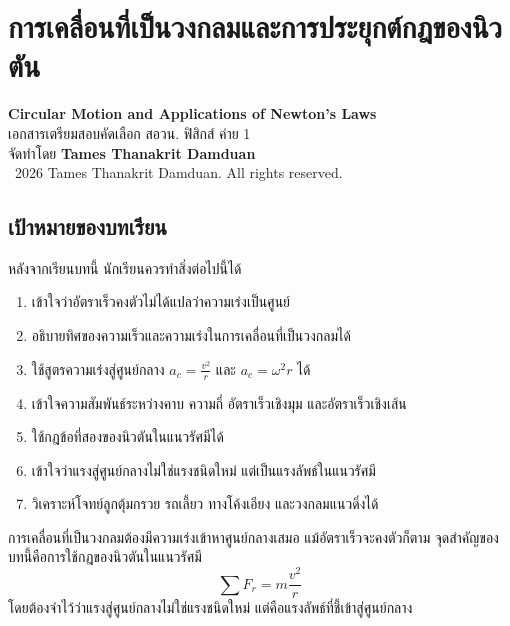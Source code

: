 
\chapter{การเคลื่อนที่เป็นวงกลมและการประยุกต์กฎของนิวตัน}

\begin{center}
    {\Large \textbf{Circular Motion and Applications of Newton's Laws}}\\[4pt]
    {\normalsize เอกสารเตรียมสอบคัดเลือก สอวน. ฟิสิกส์ ค่าย 1}\\[6pt]
    {\normalsize จัดทำโดย \textbf{Tames Thanakrit Damduan}}\\[2pt]
    {\footnotesize \textcopyright\ 2026 Tames Thanakrit Damduan. All rights reserved.}\\[8pt]
\end{center}

\section*{เป้าหมายของบทเรียน}

หลังจากเรียนบทนี้ นักเรียนควรทำสิ่งต่อไปนี้ได้

\begin{enumerate}
    \item เข้าใจว่าอัตราเร็วคงตัวไม่ได้แปลว่าความเร่งเป็นศูนย์
    \item อธิบายทิศของความเร็วและความเร่งในการเคลื่อนที่เป็นวงกลมได้
    \item ใช้สูตรความเร่งสู่ศูนย์กลาง $a_c=\frac{v^2}{r}$ และ $a_c=\omega^2r$ ได้
    \item เข้าใจความสัมพันธ์ระหว่างคาบ ความถี่ อัตราเร็วเชิงมุม และอัตราเร็วเชิงเส้น
    \item ใช้กฎข้อที่สองของนิวตันในแนวรัศมีได้
    \item เข้าใจว่าแรงสู่ศูนย์กลางไม่ใช่แรงชนิดใหม่ แต่เป็นแรงลัพธ์ในแนวรัศมี
    \item วิเคราะห์โจทย์ลูกตุ้มกรวย รถเลี้ยว ทางโค้งเอียง และวงกลมแนวดิ่งได้
\end{enumerate}

\begin{tcolorbox}[title=แนวคิดสำคัญของบทนี้]
การเคลื่อนที่เป็นวงกลมต้องมีความเร่งเข้าหาศูนย์กลางเสมอ แม้อัตราเร็วจะคงตัวก็ตาม จุดสำคัญของบทนี้คือการใช้กฎของนิวตันในแนวรัศมี
\[
\sum F_r=m\frac{v^2}{r}
\]
โดยต้องจำไว้ว่าแรงสู่ศูนย์กลางไม่ใช่แรงชนิดใหม่ แต่คือแรงลัพธ์ที่ชี้เข้าสู่ศูนย์กลาง
\end{tcolorbox}


